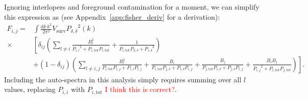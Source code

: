 \documentclass{aastex62}
\newcommand{\Gus}[1]{\textcolor{red}{#1}}
\newcommand{\beq}{\begin{equation}}
\newcommand{\eeq}{\end{equation}}
\newcommand{\denps}{\ensuremath{P_{\delta,\delta}}}
\newcommand{\xps}[2]{\ensuremath{P_{#1,#2}}}
\newcommand{\pstot}[1]{\ensuremath{P_{#1,\text{tot}}}}
\begin{document}
Ignoring interlopers and foreground contamination for a moment, we can
simplify this expression as (see Appendix~\ref{app:fisher_deriv} for a
derivation):
\beq\label{eq:fisher_nocontam}
\begin{split}
F_{i,j} =&
\int \frac{\text{d}k\,k^2}{2\pi^2} V_{\text{surv}} \denps^2(k) \\
\times & \left[ 
\delta_{ij} \left( 
\sum_{l\neq i} \frac{B_l^2}{\xps{i}{l}^2 + \pstot{i}\pstot{l}}
+ \frac{1}{\pstot{i}\xps{\delta}{\delta} + \xps{i}{\delta}^2}
\right) \right. \\
&\left. + (1-\delta_{ij}) \left( 
\sum_{l\neq i,j} \frac{B_l^2}{\pstot{l}\xps{i}{j} + \xps{i}{l}\xps{l}{j}}
+\frac{B_i}{\pstot{i}\xps{j}{\delta} + \xps{i}{\delta}\xps{i}{j}}
+ \frac{B_j}{\pstot{j}\xps{i}{\delta} + \xps{j}{\delta}\xps{i}{j}}
+ \frac{B_iB_j}{\xps{i}{j}^2 + \pstot{i}\pstot{j}}
\right)
\right]\text{.}
\end{split}
\eeq
Including the auto-spectra in this analysis simply requires summing over all
$l$ values, replacing $\xps{i}{i}$ with $\pstot{i}$ \Gus{I think this is
correct?}.

\appendix
\end{document}
